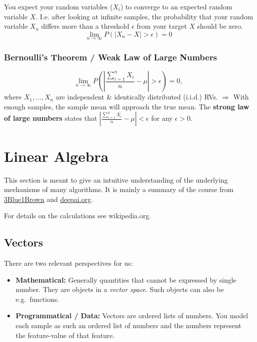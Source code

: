 \documentclass[
]{book}
\begin{document}
You expect your random variables (\(X_i\)) to converge to an expected
random variable \(X\). I.e. after looking at infinite samples, the
probability that your random variable \(X_n\) differs more than a
threshold \(\epsilon\) from your target \(X\) should be zero.
\[\lim_{n \rightarrow \infty} P(|X_n - X| > \epsilon) = 0\]

\hypertarget{bernoullis-theorem-weak-law-of-large-numbers}{%
\subsubsection{Bernoulli's Theorem / Weak Law of Large Numbers}\label{bernoullis-theorem-weak-law-of-large-numbers}}

\[\lim_{n \rightarrow \infty} P(|\frac{\sum_{i=1}^n X_i}{n} - \mu| > \epsilon) = 0,\]
where \(X_1,...,X_n\) are independent \& identically distributed (i.i.d.)
RVs. \(\Rightarrow\) With enough samples, the sample mean will approach
the true mean. The \textbf{strong law of large numbers} states that
\(|\frac{\sum_{i=1}^n X_i}{n} - \mu| < \epsilon\) for any \(\epsilon > 0\).

\hypertarget{linear-algebra}{%
\section{Linear Algebra}\label{linear-algebra}}

This section is meant to give an intuitive understanding of the
underlying mechanisms of many algorithms. It is mainly a summary of the
course from
\href{https://youtube.com/playlist?list=PLZHQObOWTQDPD3MizzM2xVFitgF8hE_ab}{3Blue1Brown}
and
\href{https://deepai.org/machine-learning-glossary-and-terms/vector}{deepai.org}.

For details on the calculations see wikipedia.org.

\hypertarget{vectors}{%
\subsection{Vectors}\label{vectors}}

There are two relevant perspectives for us:

\begin{itemize}
\item
  \textbf{Mathematical:} Generally quantities that cannot be expressed by
  single number. They are objects in a \emph{vector space}. Such objects
  can also be e.g.~functions.
\item
  \textbf{Programmatical / Data:} Vectors are ordered lists of numbers. You
  model each sample as such an ordered list of numbers and the numbers
  represent the feature-value of that feature.
\end{itemize}
\end{document}

